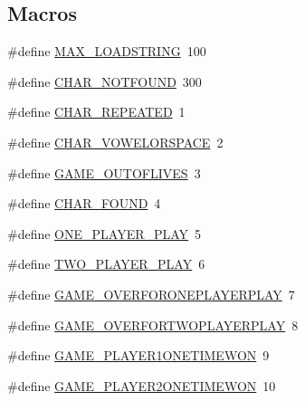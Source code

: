 \subsection*{Macros}
\begin{DoxyCompactItemize}
\item 
\#define \hyperlink{_b_o_w-a_01film_01guessing_01game_8cpp_a2b68559d692760680c326428841254d1}{M\+A\+X\+\_\+\+L\+O\+A\+D\+S\+T\+R\+I\+N\+G}~100
\item 
\#define \hyperlink{_b_o_w-a_01film_01guessing_01game_8cpp_a0ee8ac574ee810137ea85c2026eaff22}{C\+H\+A\+R\+\_\+\+N\+O\+T\+F\+O\+U\+N\+D}~300
\item 
\#define \hyperlink{_b_o_w-a_01film_01guessing_01game_8cpp_a1fbf1e25e6abe246e7a4d4d455e196e2}{C\+H\+A\+R\+\_\+\+R\+E\+P\+E\+A\+T\+E\+D}~1
\item 
\#define \hyperlink{_b_o_w-a_01film_01guessing_01game_8cpp_a27474da10fa502c19af4f6d0885d87f2}{C\+H\+A\+R\+\_\+\+V\+O\+W\+E\+L\+O\+R\+S\+P\+A\+C\+E}~2
\item 
\#define \hyperlink{_b_o_w-a_01film_01guessing_01game_8cpp_a7ff0286ba550fbb44fed0dc7b20a7873}{G\+A\+M\+E\+\_\+\+O\+U\+T\+O\+F\+L\+I\+V\+E\+S}~3
\item 
\#define \hyperlink{_b_o_w-a_01film_01guessing_01game_8cpp_af2d4bd57aad7c709659ec7592986b1ce}{C\+H\+A\+R\+\_\+\+F\+O\+U\+N\+D}~4
\item 
\#define \hyperlink{_b_o_w-a_01film_01guessing_01game_8cpp_a9e5b20e0b05707a034e74f2675f48426}{O\+N\+E\+\_\+\+P\+L\+A\+Y\+E\+R\+\_\+\+P\+L\+A\+Y}~5
\item 
\#define \hyperlink{_b_o_w-a_01film_01guessing_01game_8cpp_af30d65db35eb2666a67025267672f07a}{T\+W\+O\+\_\+\+P\+L\+A\+Y\+E\+R\+\_\+\+P\+L\+A\+Y}~6
\item 
\#define \hyperlink{_b_o_w-a_01film_01guessing_01game_8cpp_a2dd8f8a95969887f356ebd37acbb8a3a}{G\+A\+M\+E\+\_\+\+O\+V\+E\+R\+F\+O\+R\+O\+N\+E\+P\+L\+A\+Y\+E\+R\+P\+L\+A\+Y}~7
\item 
\#define \hyperlink{_b_o_w-a_01film_01guessing_01game_8cpp_a15b223e1da0e8d80a58e62f2ff3587ce}{G\+A\+M\+E\+\_\+\+O\+V\+E\+R\+F\+O\+R\+T\+W\+O\+P\+L\+A\+Y\+E\+R\+P\+L\+A\+Y}~8
\item 
\#define \hyperlink{_b_o_w-a_01film_01guessing_01game_8cpp_a835a0f64a6b2ef81005c0e85014132b1}{G\+A\+M\+E\+\_\+\+P\+L\+A\+Y\+E\+R1\+O\+N\+E\+T\+I\+M\+E\+W\+O\+N}~9
\item 
\#define \hyperlink{_b_o_w-a_01film_01guessing_01game_8cpp_a3ac1db3c91fc577703a04633ad710222}{G\+A\+M\+E\+\_\+\+P\+L\+A\+Y\+E\+R2\+O\+N\+E\+T\+I\+M\+E\+W\+O\+N}~10

\end{DoxyCompactItemize}
